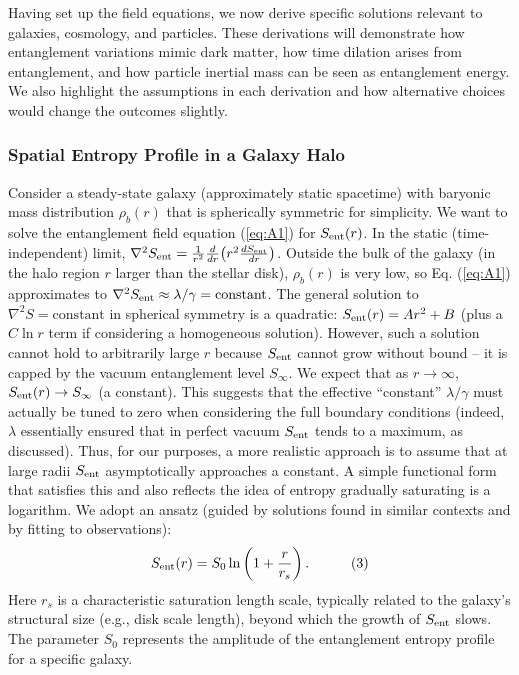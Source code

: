 \documentclass[11pt]{article}
\begin{document}
Having set up the field equations, we now derive specific solutions relevant to galaxies, cosmology, and particles. These derivations will demonstrate how entanglement variations mimic dark matter, how time dilation arises from entanglement, and how particle inertial mass can be seen as entanglement energy. We also highlight the assumptions in each derivation and how alternative choices would change the outcomes slightly.

\subsubsection{Spatial Entropy Profile in a Galaxy Halo} %

Consider a steady-state galaxy (approximately static spacetime) with baryonic mass distribution $\rho_b(r)$ that is spherically symmetric for simplicity. We want to solve the entanglement field equation (\ref{eq:A1}) for $S_{\rm ent}(r)$. In the static (time-independent) limit, $\nabla^2 S_{\rm ent} = \frac{1}{r^2}\frac{d}{dr}\!\left(r^2\frac{d S_{\rm ent}}{dr}\right)$. Outside the bulk of the galaxy (in the halo region $r$ larger than the stellar disk), $\rho_b(r)$ is very low, so Eq. (\ref{eq:A1}) approximates to $\nabla^2 S_{\rm ent} \approx \lambda/\gamma = \text{constant}$. The general solution to $\nabla^2 S = \text{constant}$ in spherical symmetry is a quadratic: $S_{\rm ent}(r) = Ar^2+B$ (plus a $C\ln r$ term if considering a homogeneous solution). However, such a solution cannot hold to arbitrarily large $r$ because $S_{\rm ent}$ cannot grow without bound – it is capped by the vacuum entanglement level $S_\infty$. We expect that as $r\to\infty$, $S_{\rm ent}(r) \to S_\infty$ (a constant). This suggests that the effective “constant” $\lambda/\gamma$ must actually be tuned to zero when considering the full boundary conditions (indeed, $\lambda$ essentially ensured that in perfect vacuum $S_{\rm ent}$ tends to a maximum, as discussed). Thus, for our purposes, a more realistic approach is to assume that at large radii $S_{\rm ent}$ asymptotically approaches a constant. A simple functional form that satisfies this and also reflects the idea of entropy gradually saturating is a logarithm. We adopt an ansatz (guided by solutions found in similar contexts and by fitting to observations):  
\begin{equation} 
S_{\rm ent}(r) = S_0 \ln\left(1 + \frac{r}{r_s}\right). \quad \tag{3} \label{eq:A3} 
\end{equation}
Here $r_s$ is a characteristic saturation length scale, typically related to the galaxy's structural size (e.g., disk scale length), beyond which the growth of $S_{\rm ent}$ slows. The parameter $S_0$ represents the amplitude of the entanglement entropy profile for a specific galaxy.  
\end{document}
